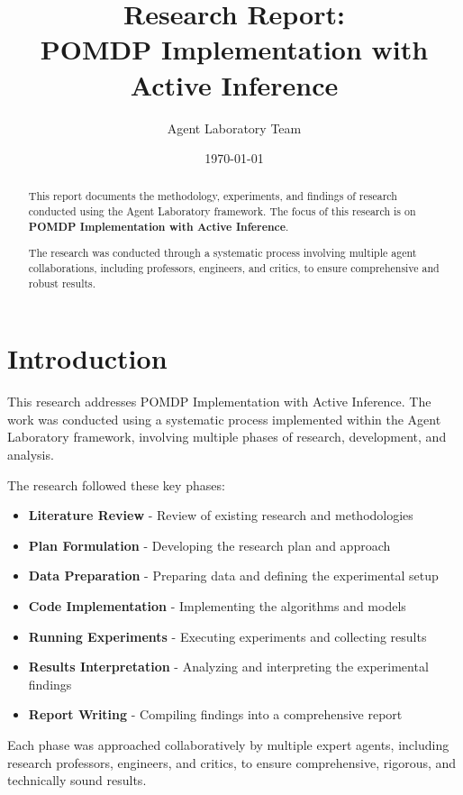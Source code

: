 \documentclass[11pt,a4paper]{article}
\title{\textbf{\Large{Research Report:}} \\ \huge{\textsf{POMDP Implementation with Active Inference}}}
\author{Agent Laboratory Team}
\date{\today}
\begin{document}
\maketitle

\begin{abstract}
This report documents the methodology, experiments, and findings of research conducted using the Agent Laboratory framework. The focus of this research is on \textbf{POMDP Implementation with Active Inference}.

The research was conducted through a systematic process involving multiple agent collaborations, including professors, engineers, and critics, to ensure comprehensive and robust results.
\end{abstract}

\tableofcontents
\newpage

\section{Introduction}
This research addresses POMDP Implementation with Active Inference. The work was conducted using a systematic process implemented within the Agent Laboratory framework, involving multiple phases of research, development, and analysis.

The research followed these key phases:
\begin{itemize}

\item \textbf{Literature Review} - Review of existing research and methodologies
\item \textbf{Plan Formulation} - Developing the research plan and approach
\item \textbf{Data Preparation} - Preparing data and defining the experimental setup
\item \textbf{Code Implementation} - Implementing the algorithms and models
\item \textbf{Running Experiments} - Executing experiments and collecting results
\item \textbf{Results Interpretation} - Analyzing and interpreting the experimental findings
\item \textbf{Report Writing} - Compiling findings into a comprehensive report
\end{itemize}

Each phase was approached collaboratively by multiple expert agents, including research professors, engineers, and critics, to ensure comprehensive, rigorous, and technically sound results.
\end{document}
